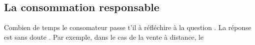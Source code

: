 \subsection{La consommation responsable}

Combien de temps le consomateur passe t'il à réfléchire à la question .
La réponse est sans doute .
Par exemple, dans le cas de la vente à distance, le 